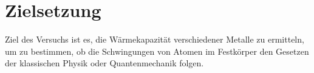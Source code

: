 
\section{Zielsetzung}
\label{sec:Zielsetzung}

Ziel des Versuchs ist es, die Wärmekapazität verschiedener Metalle zu ermitteln, um zu bestimmen, ob die Schwingungen von Atomen im Festkörper den Gesetzen der klassischen Physik oder Quantenmechanik folgen.